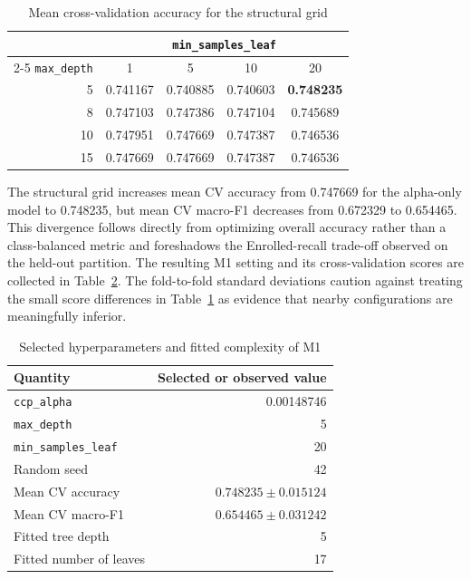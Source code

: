 \begin{table}[H]
  \centering
  \small
  \caption{Mean cross-validation accuracy for the structural grid}
  \label{tab:f1-grid}
  \begin{tabular}{@{}rcccc@{}}
    \toprule
    & \multicolumn{4}{c}{\texttt{min\_samples\_leaf}} \\
    \cmidrule(l){2-5}
    \texttt{max\_depth} & 1 & 5 & 10 & 20 \\
    \midrule
     5 & 0.741167 & 0.740885 & 0.740603 & \textbf{0.748235} \\
     8 & 0.747103 & 0.747386 & 0.747104 & 0.745689 \\
    10 & 0.747951 & 0.747669 & 0.747387 & 0.746536 \\
    15 & 0.747669 & 0.747669 & 0.747387 & 0.746536 \\
    \bottomrule
  \end{tabular}
\end{table}

The structural grid increases mean CV accuracy from 0.747669 for the
alpha-only model to 0.748235, but mean CV macro-F1 decreases from 0.672329 to
0.654465. This divergence follows directly from optimizing overall accuracy
rather than a class-balanced metric and foreshadows the Enrolled-recall
trade-off observed on the held-out partition. The resulting M1 setting and
its cross-validation scores are collected in Table~\ref{tab:f1-setting}.
The fold-to-fold standard deviations caution against treating the small score
differences in Table~\ref{tab:f1-grid} as evidence that nearby configurations
are meaningfully inferior.

\begin{table}[H]
  \centering
  \small
  \caption{Selected hyperparameters and fitted complexity of M1}
  \label{tab:f1-setting}
  \begin{tabular}{@{}lr@{}}
    \toprule
    Quantity & Selected or observed value \\
    \midrule
    \texttt{ccp\_alpha} & 0.00148746 \\
    \texttt{max\_depth} & 5 \\
    \texttt{min\_samples\_leaf} & 20 \\
    Random seed & 42 \\
    Mean CV accuracy & $0.748235 \pm 0.015124$ \\
    Mean CV macro-F1 & $0.654465 \pm 0.031242$ \\
    Fitted tree depth & 5 \\
    Fitted number of leaves & 17 \\
    \bottomrule
  \end{tabular}
\end{table}

